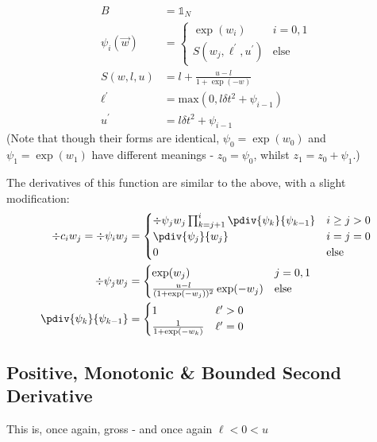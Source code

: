\documentclass[]{article}
\begin{document}
				\begin{align}
					B & = \mathds{1}_N
					\\
					\psi_i(\vec{w}) & = \begin{cases}
						\exp(w_i) & i = 0,1
						\\ 
						S(w_j,\ell^\prime,u^\prime) & \text{else}
					\end{cases}
					\\
					S(w,l,u) & = l + \frac{u- l}{1 + \exp(-w)}
					\\
					\ell^\prime &= \text{max}(0,l \delta t^2 + \psi_{i-1})
					\\
					u^\prime & = l \delta t^2 + \psi_{i-1}
				\end{align}
				(Note that though their forms are identical, $\psi_0 = \exp(w_0)$ and $\psi_1 = \exp(w_1)$ have different meanings - $z_0 = \psi_0$, whilst $z_1 = z_0 + \psi_1$.)

				The derivatives of this function are similar to the above, with a slight modification:
				\begin{align}
					\div{c_i}{w_j} = \div{\psi_i}{w_j} & = \begin{cases} 
						\div{\psi_j}{w_j} \prod_{k = j+1}^i \pdiv{\psi_k}{\psi_{k-1}} & i\geq j > 0
						\\
						\pdiv{\psi_j}{w_j} & i=j=0
						\\
						0 &\text{else}
					\end{cases}
					\\
					\div{\psi_j}{w_j} & = \begin{cases} \exp(w_j) & j = 0,1
						\\
						\frac{u - l}{(1 + \exp(-w_j))^2} \exp(-w_j) & \text{else}
					\end{cases}
					\\
					\pdiv{\psi_k}{\psi_{k-1}} & = \begin{cases} 1 & \ell^\prime > 0
						\\
						\frac{1}{1 + \exp(-w_k)} & \ell^\prime = 0\end{cases}
				\end{align}

			\subsection{Positive, Monotonic \& Bounded Second Derivative}

				This is, once again, gross - and once again $\ell < 0 < u$
\end{document}
